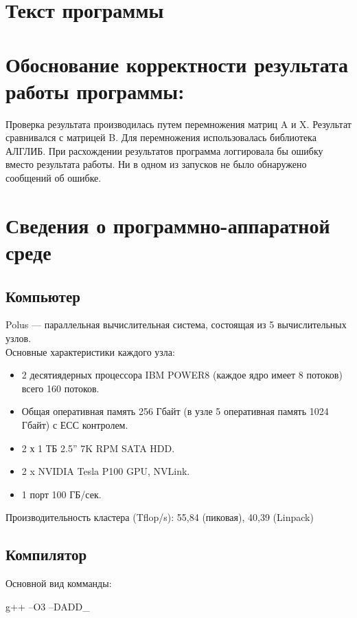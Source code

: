 \documentclass[12pt]{article}
\begin{document}
	\section{Текст программы}
	\lstset{ language=c,
		breaklines=true,
		basicstyle=\footnotesize\ttfamily}
	\linespread{1}
	

	\section{Обоснование корректности результата работы программы:}
	Проверка результата производилась путем перемножения матриц A и X. Результат сравнивался с матрицей B. Для перемножения использовалась библиотека АЛГЛИБ. При расхождении результатов программа логгировала бы ошибку вместо результата работы. Ни в одном из запусков не было обнаружено сообщений об ошибке.
	
	\section{Сведения о программно-аппаратной среде}
	
	\subsection{Компьютер}
	Polus --- параллельная вычислительная система, состоящая из 5 вычислительных узлов. \\

	\noindent
	Основные характеристики каждого узла:
	\begin{itemize}
		\item 2 десятиядерных процессора IBM POWER8 (каждое ядро имеет 8 потоков) всего 160 потоков.
		\item Общая оперативная память 256 Гбайт (в узле 5 оперативная память 1024 Гбайт) с ЕСС контролем.
		\item 2 х 1 ТБ 2.5” 7K RPM SATA HDD.
		\item 2 x NVIDIA Tesla P100 GPU, NVLink.
		\item 1 порт 100 ГБ/сек.
	\end{itemize}
	
	\noindent
	Производительность кластера (Tflop/s): 55,84 (пиковая), 40,39 (Linpack)
	
	\subsection{Компилятор}
	Основной вид комманды: \\
	\centerline{g++ --O3 --DADD\_}
	
\end{document}
